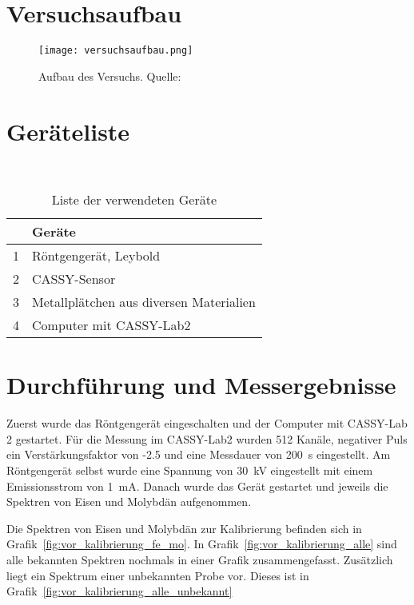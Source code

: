 \documentclass{article}
\begin{document}



\section{Versuchsaufbau}

\begin{figure}[H]
\texttt{[image: versuchsaufbau.png]}
\caption{Aufbau des Versuchs. Quelle: \cite{moodle}}
\label{fig:aufbau}

\end{figure}



\section{Geräteliste}


\begin{table}[H]
\caption{Liste der verwendeten Geräte}
~
\begin{tabular}{l|l}
 & Geräte  \\
\hline
1 & Röntgengerät, Leybold \\
2 & CASSY-Sensor \\	
3 & Metallplätchen aus diversen Materialien\\
4 & Computer mit CASSY-Lab2
\end{tabular}

\end{table}


\section{Durchführung und Messergebnisse}

Zuerst wurde das Röntgengerät eingeschalten und der Computer mit CASSY-Lab 2 gestartet. Für die Messung im CASSY-Lab2 wurden 512 Kanäle, negativer Puls ein Verstärkungsfaktor von -2.5 und eine Messdauer von 200~s eingestellt. Am Röntgengerät selbst wurde eine Spannung von 30~kV eingestellt mit einem Emissionsstrom von 1~mA. Danach wurde das Gerät gestartet und jeweils die Spektren von Eisen und Molybdän aufgenommen.

Die Spektren von Eisen und Molybdän zur Kalibrierung befinden sich in Grafik~\ref{fig:vor_kalibrierung_fe_mo}. In Grafik~\ref{fig:vor_kalibrierung_alle} sind alle bekannten Spektren nochmals in einer Grafik zusammengefasst. Zusätzlich liegt ein Spektrum einer unbekannten Probe vor. Dieses ist in Grafik~\ref{fig:vor_kalibrierung_alle_unbekannt}
\end{document}
